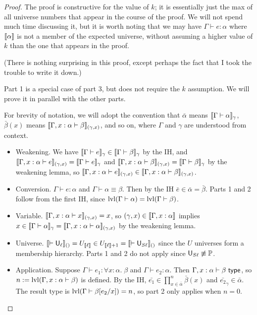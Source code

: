 \begin{proof}
The proof is constructive for the value of $k$; it is essentially just the max of all universe numbers that appear in the course of the proof. We will not spend much time discussing it, but it is worth noting that we may have $\Gamma\vdash e:\alpha$ where $\llbracket \alpha\rrbracket$ is not a member of the expected universe, without assuming a higher value of $k$ than the one that appears in the proof.

(There is nothing surprising in this proof, except perhaps the fact that I took the trouble to write it down.)

Part 1 is a special case of part 3, but does not require the $k$ assumption. We will prove it in parallel with the other parts.

For brevity of notation, we will adopt the convention that $\bar\alpha$ means $\scott{\Gamma\vdash\alpha}_\gamma$, $\bar\beta(x)$ means $\scott{\Gamma,x:\alpha\vdash\beta}_{(\gamma,x)}$, and so on, where $\Gamma$ and $\gamma$ are understood from context.
\begin{itemize}
\item Weakening. We have $\scott{\Gamma\vdash e}_\gamma\in\scott{\Gamma\vdash\beta}_\gamma$ by the IH, and $\scott{\Gamma,x:\alpha\vdash e}_{(\gamma,x)}=\scott{\Gamma\vdash e}_\gamma$ and $\scott{\Gamma,x:\alpha\vdash\beta}_{(\gamma,x)}=\scott{\Gamma\vdash\beta}_\gamma$ by the weakening lemma, so $\scott{\Gamma,x:\alpha\vdash e}_{(\gamma,x)}\in \scott{\Gamma,x:\alpha\vdash\beta}_{(\gamma,x)}$.
\item Conversion. $\Gamma\vdash e:\alpha$ and $\Gamma\vdash\alpha\equiv\beta$. Then by the IH $\bar e\in\bar \alpha=\bar\beta$. Parts 1 and 2 follow from the first IH, since $\lvl(\Gamma\vdash\alpha)=\lvl(\Gamma\vdash\beta)$.
\item Variable. $\scott{\Gamma,x:\alpha\vdash x}_{(\gamma,x)}=x$, so $(\gamma,x)\in\scott{\Gamma,x:\alpha}$ implies $x\in\scott{\Gamma\vdash\alpha}_\gamma=\scott{\Gamma,x:\alpha\vdash\alpha}_{(\gamma,x)}$ by the weakening lemma.
\item Universe. $\llbracket \vdash\mathsf{U}_{\ell}\rrbracket_{()}=U_{\llbracket \ell\rrbracket}\in U_{\llbracket \ell\rrbracket+1}=\llbracket \vdash\mathsf{U}_{S\ell}\rrbracket_{()}$ since the $U$ universes form a membership hierarchy. Parts 1 and 2 do not apply since $\mathsf{U}_{S\ell}\not\equiv\mathbb{P}$.
\item Application. Suppose $\Gamma\vdash e_1:\forall x:\alpha.\;\beta$ and $\Gamma\vdash e_2:\alpha$. Then $\Gamma,x:\alpha\vdash\beta\type$, so $n:=\lvl(\Gamma,x:\alpha\vdash\beta)$ is defined. By the IH, $\bar{e_1}\in\prod^n_{x\in \bar\alpha}\bar\beta(x)$ and $\bar{e_2}_\gamma\in\bar\alpha$. The result type is $\lvl(\Gamma\vdash\beta[e_2/x])=n$, so part 2 only applies when $n=0$.

\end{itemize}
\end{proof}
